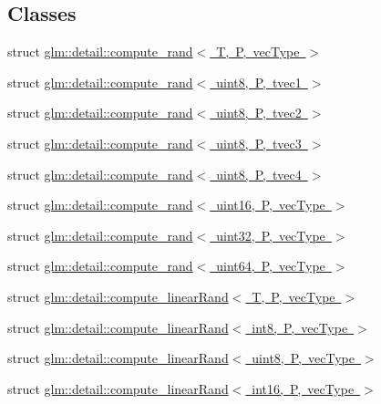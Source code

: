 \subsection*{Classes}
\begin{DoxyCompactItemize}
\item 
struct \mbox{\hyperlink{structglm_1_1detail_1_1compute__rand}{glm\+::detail\+::compute\+\_\+rand$<$ T, P, vec\+Type $>$}}
\item 
struct \mbox{\hyperlink{structglm_1_1detail_1_1compute__rand_3_01uint8_00_01_p_00_01tvec1_01_4}{glm\+::detail\+::compute\+\_\+rand$<$ uint8, P, tvec1 $>$}}
\item 
struct \mbox{\hyperlink{structglm_1_1detail_1_1compute__rand_3_01uint8_00_01_p_00_01tvec2_01_4}{glm\+::detail\+::compute\+\_\+rand$<$ uint8, P, tvec2 $>$}}
\item 
struct \mbox{\hyperlink{structglm_1_1detail_1_1compute__rand_3_01uint8_00_01_p_00_01tvec3_01_4}{glm\+::detail\+::compute\+\_\+rand$<$ uint8, P, tvec3 $>$}}
\item 
struct \mbox{\hyperlink{structglm_1_1detail_1_1compute__rand_3_01uint8_00_01_p_00_01tvec4_01_4}{glm\+::detail\+::compute\+\_\+rand$<$ uint8, P, tvec4 $>$}}
\item 
struct \mbox{\hyperlink{structglm_1_1detail_1_1compute__rand_3_01uint16_00_01_p_00_01vec_type_01_4}{glm\+::detail\+::compute\+\_\+rand$<$ uint16, P, vec\+Type $>$}}
\item 
struct \mbox{\hyperlink{structglm_1_1detail_1_1compute__rand_3_01uint32_00_01_p_00_01vec_type_01_4}{glm\+::detail\+::compute\+\_\+rand$<$ uint32, P, vec\+Type $>$}}
\item 
struct \mbox{\hyperlink{structglm_1_1detail_1_1compute__rand_3_01uint64_00_01_p_00_01vec_type_01_4}{glm\+::detail\+::compute\+\_\+rand$<$ uint64, P, vec\+Type $>$}}
\item 
struct \mbox{\hyperlink{structglm_1_1detail_1_1compute__linear_rand}{glm\+::detail\+::compute\+\_\+linear\+Rand$<$ T, P, vec\+Type $>$}}
\item 
struct \mbox{\hyperlink{structglm_1_1detail_1_1compute__linear_rand_3_01int8_00_01_p_00_01vec_type_01_4}{glm\+::detail\+::compute\+\_\+linear\+Rand$<$ int8, P, vec\+Type $>$}}
\item 
struct \mbox{\hyperlink{structglm_1_1detail_1_1compute__linear_rand_3_01uint8_00_01_p_00_01vec_type_01_4}{glm\+::detail\+::compute\+\_\+linear\+Rand$<$ uint8, P, vec\+Type $>$}}
\item 
struct \mbox{\hyperlink{structglm_1_1detail_1_1compute__linear_rand_3_01int16_00_01_p_00_01vec_type_01_4}{glm\+::detail\+::compute\+\_\+linear\+Rand$<$ int16, P, vec\+Type $>$}}

\end{DoxyCompactItemize}
